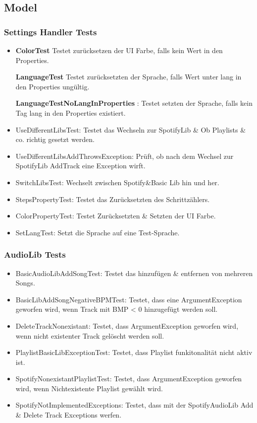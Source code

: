 \documentclass[../validierung.tex]{subfiles}
\begin{document}
\subsection{Model}
	\subsubsection{Settings Handler Tests}
		\begin{itemize}
			\item\textbf{ColorTest} Testet zurücksetzen der UI Farbe, falls kein Wert in den Properties.
			\item[\textbf{LanguageTest}] Testet zurücksetzten der Sprache, falls Wert unter lang in den Properties ungültig.
			\item[\textbf{LanguageTestNoLangInProperties}]: Testet setzten der Sprache, falls kein Tag lang in den Properties existiert.
			\item UseDifferentLibsTest: Testet das Wechseln zur SpotifyLib \& Ob Playlists \& co. richtig gesetzt werden.
			\item UseDifferentLibsAddThrowsException: Prüft, ob nach dem Wechsel zur SpotifyLib AddTrack eine Exception wirft.
			\item SwitchLibsTest: Wechselt zwischen Spotify{\&}Basic Lib hin und her.
			\item StepsPropertyTest: Testet das Zurücksetzten des Schrittzählers.
			\item ColorPropertyTest: Testet Zurücksetzten \& Setzten der UI Farbe.
			\item SetLangTest: Setzt die Sprache auf eine Test-Sprache.
		\end{itemize}
	\subsubsection{AudioLib Tests}
		\begin{itemize}
			\item BasicAudioLibAddSongTest: Testet das hinzufügen \& entfernen von mehreren Songs.
			\item BasicLibAddSongNegativeBPMTest: Testet, dass eine ArgumentException geworfen wird, wenn Track mit BMP < 0 hinzugefügt werden soll.
			\item DeleteTrackNonexistant: Testet, dass ArgumentException geworfen wird, wenn nicht existenter Track gelöscht werden soll.
			\item PlaylistBasicLibExceptionTest: Testet, dass Playlist funkitonalität nicht aktiv ist.
			\item SpotifyNonexistantPlaylistTest: Testet, dass ArgumentException geworfen wird, wenn Nichtexistente Playlist gewählt wird.
			\item SpotifyNotImplementedExceptions: Testet, dass mit der SpotifyAudioLib Add \& Delete Track Exceptions werfen.
		\end{itemize}
\end{document}
